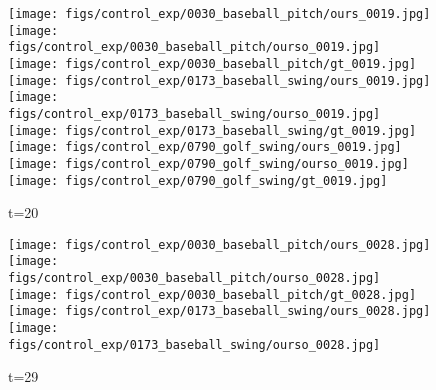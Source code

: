 \documentclass{article}
\begin{document}
\begin{appendix}
\begin{figure*}[!thbp]
\begin{subfigure}{0.12\linewidth}
	\end{subfigure} 
    \begin{subfigure}{0.12\linewidth}
        \caption*{t=20}
        \vspace{-7pt}
	    \texttt{[image: figs/control\_exp/0030\_baseball\_pitch/ours\_0019.jpg]}
	    \texttt{[image: figs/control\_exp/0030\_baseball\_pitch/ourso\_0019.jpg]}
	    \vspace{.2cm}
  		\texttt{[image: figs/control\_exp/0030\_baseball\_pitch/gt\_0019.jpg]}
  		\texttt{[image: figs/control\_exp/0173\_baseball\_swing/ours\_0019.jpg]}
  		\texttt{[image: figs/control\_exp/0173\_baseball\_swing/ourso\_0019.jpg]}
  		\vspace{.2cm}
  		\texttt{[image: figs/control\_exp/0173\_baseball\_swing/gt\_0019.jpg]}
  		\texttt{[image: figs/control\_exp/0790\_golf\_swing/ours\_0019.jpg]}
  		\texttt{[image: figs/control\_exp/0790\_golf\_swing/ourso\_0019.jpg]}
  		\vspace{.2cm}
  		\texttt{[image: figs/control\_exp/0790\_golf\_swing/gt\_0019.jpg]}
	\end{subfigure} 
    \begin{subfigure}{0.12\linewidth}
        \caption*{t=29}
        \vspace{-7pt}
	    \texttt{[image: figs/control\_exp/0030\_baseball\_pitch/ours\_0028.jpg]}
	    \texttt{[image: figs/control\_exp/0030\_baseball\_pitch/ourso\_0028.jpg]}
	    \vspace{.2cm}
  		\texttt{[image: figs/control\_exp/0030\_baseball\_pitch/gt\_0028.jpg]}
  		\texttt{[image: figs/control\_exp/0173\_baseball\_swing/ours\_0028.jpg]}
  		\texttt{[image: figs/control\_exp/0173\_baseball\_swing/ourso\_0028.jpg]}
  		\vspace{.2cm}

\end{subfigure}
\end{figure*}
\end{appendix}
\end{document}
